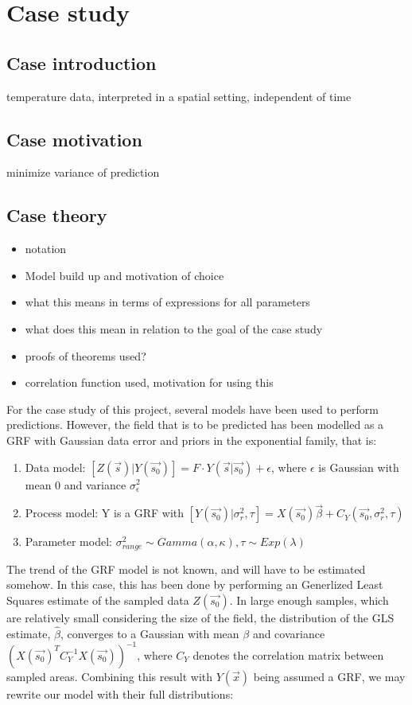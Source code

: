 \documentclass{report}
\begin{document}
\section{Case study}
\subsection{Case introduction}
temperature data, interpreted in a spatial setting, independent of time
\subsection{Case motivation}
minimize variance of prediction
\subsection{Case theory}
\begin{itemize}
\item notation
\item Model build up and motivation of choice
\item what this means in terms of expressions for all parameters
\item what does this mean in relation to the goal of the case study
\item proofs of theorems used?
\item correlation function used, motivation for using this
\end{itemize}
For the case study of this project, several models have been used to perform predictions. However, the field that is to be predicted has been modelled as a GRF with Gaussian data error and priors in the exponential family, that is: \\
\begin{enumerate}
\item Data model: $[Z(\vec{s})|Y(\vec{s_0})] = F \cdot Y(\vec{s} | \vec{s_0}) + \epsilon$, where $\epsilon$ is Gaussian with mean 0 and variance $\sigma_{\epsilon}^2$
\item Process model: Y is a GRF with $[Y(\vec{s_0}) | \sigma_{r}^2, \tau]  = X(\vec{s_0})\vec{\beta} + C_Y(\vec{s_0}, \sigma_{r}^2, \tau)$
\item Parameter model: $\sigma_{range}^2 \sim Gamma(\alpha, \kappa), \tau \sim Exp(\lambda)$ 
\end{enumerate}
The trend of the GRF model is not known, and will have to be estimated somehow. In this case, this has been done by performing an Generlized Least Squares estimate of the sampled data $Z(\vec{s_0})$. In large enough samples, which are relatively small considering the size of the field, the distribution of the GLS estimate, $\hat\beta$, converges to a Gaussian with mean $\beta$ and covariance $(X(\vec{s_0})^{T}C_Y^{-1}X(\vec{s_0}))^{-1}$, where $C_Y$ denotes the correlation matrix between sampled areas. Combining this result with $Y(\vec{x})$ being assumed a GRF, we may rewrite our model with their full distributions:
\end{document}
